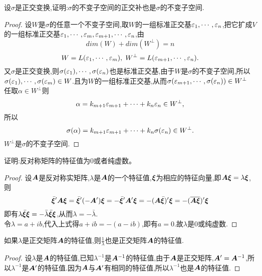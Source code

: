\documentclass[lang=cn,11pt,normal]{elegantbook}
\begin{document}
	\begin{exercise}
		设$\sigma$是正交变换,证明:$\sigma$的不变子空间的正交补也是$\sigma$的不变子空间.
	\end{exercise}
	\begin{proof}
		设$W$是$\sigma$的任意一个不变子空间,取$W$的一组标准正交基$\varep_1,\cdots,\varep_n$,把它扩成$V$的一组标准正交基$\varep_1,\cdots,\varep_m,\varep_{m+1},\cdots,\varep_n$,由
		\begin{equation}
		dim(W)+dim(W^\perp)=n
		\end{equation}
		\begin{equation}
		W=L(\varep_1,\cdots,\varep_m),\;W^\perp=L(\varep_{m+1},\cdots,\varep_n).
		\end{equation}
		又$\sigma$是正交变换,则$\sigma(\varep_1),\cdots,\sigma(\varep_n)$也是标准正交基,由于$W$是$\sigma$的不变子空间,所以$\sigma(\varep_1),\cdots,\sigma(\varep_m)\in W$.且为$W$的一组标准正交基,从而$\sigma(\varep_{m+1},\cdots,\sigma(\varep_n))\in W^\perp$\\
		任取$\alpha\in W^\perp$则
		\begin{equation}
		\alpha=k_{m+1}\varep_{m+1}+\cdots+k_n\varep_n\in W^\perp,
		\end{equation}
		所以
		\begin{equation}
		\sigma(\alpha)=k_{m+1}\varep_{m+1}+\cdots+k_n\sigma(\varep_n)\in W^\perp.
		\end{equation}
		$W^\perp$是$\sigma$的不变子空间.
	\end{proof}
	\begin{exercise}
		证明:反对称矩阵的特征值为0或者纯虚数。
	\end{exercise}
	\begin{proof}
		设$\AA$是反对称实矩阵,$\lambda$是$\AA$的一个特征值,$\bfxi$为相应的特征向量,即$\AA\bfxi=\lambda\bfxi$,则
		\begin{equation}
		\bar{\bfxi}'\AA\bfxi=\bar{\bfxi}'(-\AA')\bfxi=-\bar{\bfxi}'\AA'\bfxi=-(\AA\bar{\bfxi})'\bfxi=-(\overline{\AA\bfxi})'\bfxi
		\end{equation}
		即有$\lambda\bar{\bfxi}\bfxi=-\bar{\lambda}\bar{\bfxi}\bfxi$,从而$\lambda=-\bar{\lambda}$.\\
		令$\lambda=a+ib$,代入上式得$a+ib=-(a-ib)$,即有$a=0$.故$\lambda$是0或纯虚数.
	\end{proof}
	\begin{exercise}
		如果$\lambda$是正交矩阵$\AA$的特征值,则$\frac{1}{\lambda}$也是正交矩阵$\AA$的特征值.
	\end{exercise}
	\begin{proof}
		设$\lambda$是$\AA$的特征值,已知$\lambda^{-1}$是$\AA^{-1}$的特征值,由于$\AA$是正交矩阵,$\AA'=\AA^{-1}$,所以$\lambda^{-1}$是$\AA'$的特征值.因为$\AA$与$\AA'$有相同的特征值,所以$\lambda^{-1}$也是$\AA$的特征值.
	\end{proof}
\end{document}
